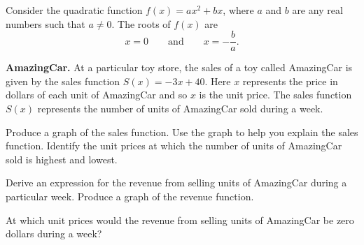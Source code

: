 \documentclass[a4paper,oneside,12pt]{article}
\begin{document}
\begin{theorem}
\label{thm:quadratic_function_vertical_intercept_zero}
Consider the quadratic function $f(x) = ax^2 + bx$, where $a$ and $b$
are any real numbers such that $a \neq 0$.  The roots of $f(x)$ are
\[
x = 0
\qquad
\text{and}
\qquad
x = -\frac{b}{a}.
\]
\end{theorem}

\begin{example}
\label{eg:AmazingCar}
\textbf{AmazingCar.}
At a particular toy store, the sales of a toy called AmazingCar is
given by the sales function $S(x) = -3x + 40$.  Here $x$ represents
the price in dollars of each unit of AmazingCar and so $x$ is the unit
price.  The sales function $S(x)$ represents the number of units of
AmazingCar sold during a week.
\begin{packedenum}
\item\label{subeg:AmazingCar_graph_sales_function}
  Produce a graph of the sales function.  Use the graph to help you
  explain the sales function.  Identify the unit prices at which the
  number of units of AmazingCar sold is highest and lowest.

\item\label{subeg:AmazingCar_revenue_function}
  Derive an expression for the revenue from selling units of
  AmazingCar during a particular week.  Produce a graph of the revenue
  function.

\item\label{subeg:AmazingCar_price_zero_revenue}
  At which unit prices would the revenue from selling units of
  AmazingCar be zero dollars during a week?
\end{packedenum}
\end{example}
\end{document}
